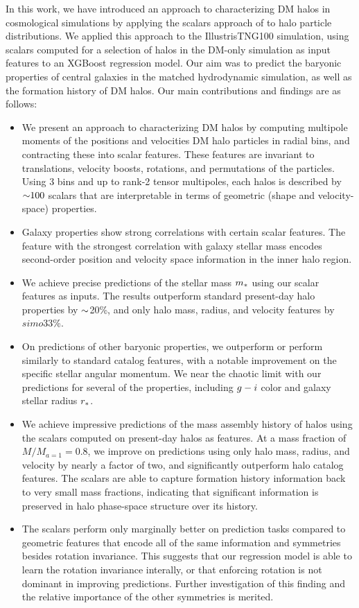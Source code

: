 In this work, we have introduced an approach to characterizing DM halos in cosmological simulations by applying the scalars approach of \cite{Villar2021a} to halo particle distributions.
We applied this approach to the IllustrisTNG100 simulation, using scalars computed for a selection of halos in the DM-only simulation as input features to an XGBoost regression model.
Our aim was to predict the baryonic properties of central galaxies in the matched hydrodynamic simulation, as well as the formation history of DM halos.
Our main contributions and findings are as follows:
\begin{itemize}
    \item We present an approach to characterizing DM halos by computing multipole moments of the positions and velocities DM halo particles in radial bins, and contracting these into scalar features. These features are invariant to translations, velocity boosts, rotations, and permutations of the particles. Using 3 bins and up to rank-2 tensor multipoles, each halos is described by $\mathord{\sim}100$ scalars that are interpretable in terms of geometric (shape and velocity-space) properties.
    \item Galaxy properties show strong correlations with certain scalar features. The feature with the strongest correlation with galaxy stellar mass encodes second-order position and velocity space information in the inner halo region.
    \item We achieve precise predictions of the stellar mass $m_*$ using our scalar features as inputs. The results outperform standard present-day halo properties by $\mathord{\sim}$20\%, and only halo mass, radius, and velocity features by $simo$33\%.
    \item On predictions of other baryonic properties, we outperform or perform similarly to standard catalog features, with a notable improvement on the specific stellar angular momentum. We near the chaotic limit with our predictions for several of the properties, including $g-i$ color and galaxy stellar radius $r_*$.
    \item We achieve impressive predictions of the mass assembly history of halos using the scalars computed on present-day halos as features. At a mass fraction of $M/M_{a=1} = 0.8$, we improve on predictions using only halo mass, radius, and velocity by nearly a factor of two, and significantly outperform halo catalog features. The scalars are able to capture formation history information back to very small mass fractions, indicating that significant information is preserved in halo phase-space structure over its history. 
    \item The scalars perform only marginally better on prediction tasks compared to geometric features that encode all of the same information and symmetries besides rotation invariance. This suggests that our regression model is able to learn the rotation invariance interally, or that enforcing rotation is not dominant in improving predictions. Further investigation of this finding and the relative importance of the other symmetries is merited.
\end{itemize}



